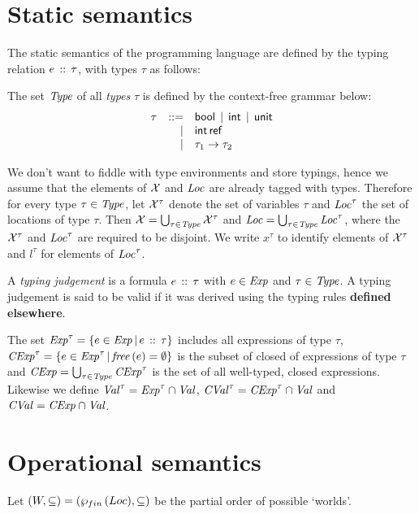 \documentclass[12pt,a4paper]{report}
\newcommand{\CExp}{\nstyle{CExp}}
\newcommand{\CVal}{\nstyle{CVal}}
\begin{document}

\section{Static semantics}

The static semantics of the programming language are defined by the typing relation
$e\,\mathrel{::}\,\tau$, with types $\tau$ as follows:

\begin{definition}[Types]
  The set $\mathit{Type}$ of all {\em types} $\tau$ is defined by the context-free grammar below:
  \[\begin{array}{rrlll}
    \tau  & ::= & \mathsf{bool} \,\mid\, \mathsf{int} \,\mid\, \mathsf{unit}
          \\ & \mid & \mathsf{int}\,\mathsf{ref}
          \\ & \mid & \tau_1\to\tau_2
  \end{array}\]
\end{definition}

We don't want to fiddle with type environments and store typings, hence we assume that
the elements of $\mathcal{X}$ and $\mathit{Loc}$ are already tagged with types. Therefore for every
type $\tau\in\mathit{Type}$, let $\mathcal{X}^\tau$ denote the set of variables $\tau$ and $\mathit{Loc}^\tau$ the
set of locations of type $\tau$. Then $\mathcal{X}=\bigcup_{\tau\in\mathit{Type}}\mathcal{X}^\tau$ and
$\mathit{Loc}=\bigcup_{\tau\in\mathit{Type}}\mathit{Loc}^\tau$, where the $\mathcal{X}^\tau$ and $\mathit{Loc}^\tau$ are
required to be disjoint. We write $x^\tau$ to identify elements of $\mathcal{X}^\tau$ and
$l^\tau$ for elements of $\mathit{Loc}^\tau$.

\begin{definition}
  A {\em typing judgement} is a formula $e\,\mathrel{::}\,\tau$ with
  $e\in\mathit{Exp}$ and $\tau\in\mathit{Type}$. A typing judgement is said to
  be valid if it was derived using the typing rules {\bf defined
  elsewhere}.
\end{definition}

The set $\mathit{Exp}^\tau = \{e\in\mathit{Exp}\,|\,e\,\mathrel{::}\,\tau\}$ includes all expressions of type $\tau$,
$\CExp^\tau = \{e\in\Exp^\tau\,|\,\free{e}=\emptyset\}$ is the subset of closed of expressions of
type $\tau$ and $\CExp = \bigcup_{\tau\in\Type} \CExp^\tau$ is the set of all well-typed, closed
expressions. Likewise we define $\mathit{Val}^\tau = \mathit{Exp}^\tau\cap\mathit{Val}$, $\CVal^\tau = \CExp^\tau \cap \Val$
and $\CVal = \CExp \cap \Val$.



\section{Operational semantics}

Let $(W,\subseteq) = (\wp_{fin}\,(Loc),\subseteq)$ be the partial order of possible `worlds'.
\end{document}
